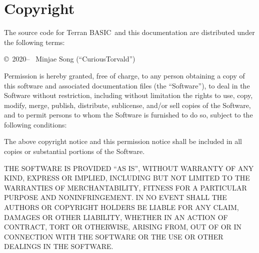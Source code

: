 \documentclass[10pt, stock, openany, chapter]{memoir}
\newcommand{\tbas}{Terran BASIC}
\begin{document}
\chapter{Copyright}

The source code for \tbas\ and this documentation are distributed under the following terms:

\copyright\ 2020-- \ Minjae Song (``CuriousTorvald'')

Permission is hereby granted, free of charge, to any person obtaining a copy
of this software and associated documentation files (the ``Software''), to deal
in the Software without restriction, including without limitation the rights
to use, copy, modify, merge, publish, distribute, sublicense, and/or sell
copies of the Software, and to permit persons to whom the Software is
furnished to do so, subject to the following conditions:

The above copyright notice and this permission notice shall be included in all
copies or substantial portions of the Software.

THE SOFTWARE IS PROVIDED ``AS IS'', WITHOUT WARRANTY OF ANY KIND, EXPRESS OR
IMPLIED, INCLUDING BUT NOT LIMITED TO THE WARRANTIES OF MERCHANTABILITY,
FITNESS FOR A PARTICULAR PURPOSE AND NONINFRINGEMENT. IN NO EVENT SHALL THE
AUTHORS OR COPYRIGHT HOLDERS BE LIABLE FOR ANY CLAIM, DAMAGES OR OTHER
LIABILITY, WHETHER IN AN ACTION OF CONTRACT, TORT OR OTHERWISE, ARISING FROM,
OUT OF OR IN CONNECTION WITH THE SOFTWARE OR THE USE OR OTHER DEALINGS IN THE
SOFTWARE.

\printindex

\afterpage{\pagestyle{empty}\null\newpage}
\end{document}
